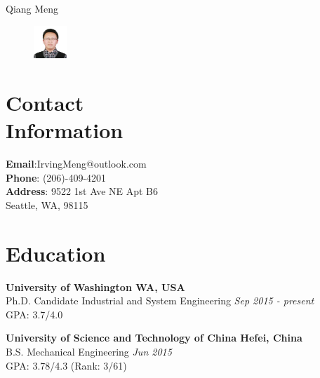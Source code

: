 \documentclass[margin,line,11pt]{resume}
\begin{document}
{\sc \Large Qiang Meng}
\begin{resume}


    \vspace{0.5cm}
    \begin{figure}
         \vspace{-0.9cm}
        \begin{center}
        \includegraphics[width=0.11\textwidth]{face}
        \end{center}
         \vspace{-1cm}
    \end{figure}

 
    \section{\mysidestyle Contact\\Information}
    \textbf{Email}:\hspace{1.5em}\quad  IrvingMeng@outlook.com \\
    \textbf{Phone}: \hspace{1.5em} (206)-409-4201\\ 
    \textbf{Address}: \hspace{1em}9522 1st Ave NE Apt B6\\
     \hspace*{6em}Seattle, WA, 98115\\     


     \section{\mysidestyle Education}
 \textbf{University of Washington  \hfill WA, USA}\\
Ph.D. Candidate \quad  Industrial and System Engineering \hfill \textit{Sep 2015 - present}\\
 GPA: 3.7/4.0 \par

 \textbf{University of Science and Technology of China \hfill Hefei, China}\\
 B.S. \quad Mechanical Engineering \hfill \textit{Jun 2015}\\
 GPA: 3.78/4.3 (Rank: 3/61)
           

\end{resume}
\end{document}

